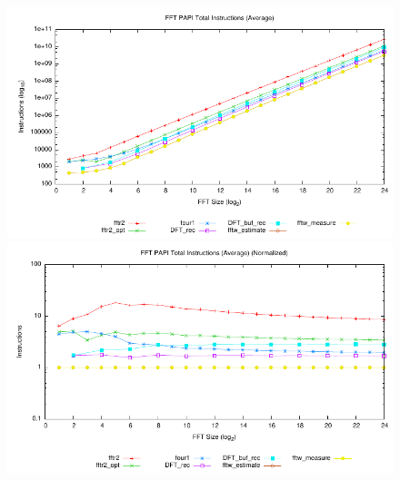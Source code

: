 \documentclass[11 pt]{article}
\begin{document}
\begin{figure}[htbp]
  \centering
	\includegraphics[width=\columnwidth]{../plots/tot_ins_ave}
	\includegraphics[width=\columnwidth]{../plots/tot_ins_ave_norm}
  \caption{}
  \label{fig:ins_ave}
\end{figure}
\end{document}
